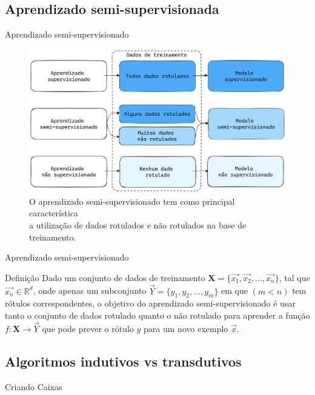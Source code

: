 \documentclass{templatebeamerufc/libs/ufc_format}
\begin{document}
\subsection{Aprendizado semi-supervisionada}

\begin{frame}{Aprendizado semi-supervisionado}
  \begin{figure}\label{fig:interactive--segmentation}
    \centering
    \caption{
      O aprendizado semi-supervisionado tem como principal
característica \\ a utilização de dados rotulados e não rotulados na base
de treinamento.
}
    \includegraphics[scale=0.1]{figuras/ilustracao-aprendizado-semi-supervisionado}
    \source{\fonteautor}
  \end{figure}
\end{frame}


\begin{frame}{Aprendizado semi-supervisionado}
  \begin{block}{Definição}
      Dado um conjunto de dados de treinamento $ \mathbf{X} =
\{\vec{x_1}, \vec{x_2}, \ldots, \vec{x_n}\} $, tal que $ \vec{x_n} \in \mathbb{R}^d $,
onde apenas um subconjunto $ \vec{Y} = \{y_1, y_2, \ldots , y_m\} $ em que
$ (m < n) $ tem rótulos correspondentes, o objetivo do aprendizado
semi-supervisionado é usar tanto o conjunto de dados rotulado quanto o
não rotulado para aprender a função $ f: \mathbf{X} \rightarrow \vec{Y} $ que
pode prever o rótulo $ y $ para um novo exemplo $ \vec{x} $.
  \end{block}
\end{frame}


\subsection{Algoritmos indutivos vs transdutivos}
\begin{frame}{Criando Caixas}

    \pause


    \pause

\end{frame}
\end{document}
